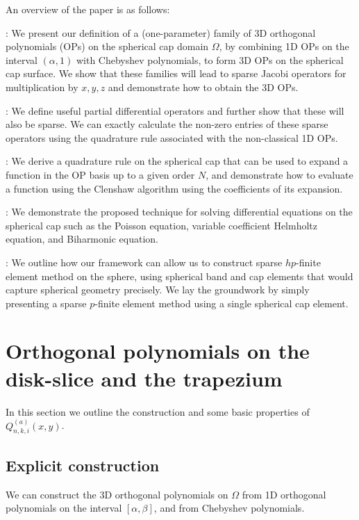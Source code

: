 \documentclass[11pt, oneside]{article}   	%
\newcommand{\scop}{Q}
\newcommand{\scopnki}{\scop_{n,k,i}}
\newcommand{\scopnkia}{\scopnki^{(a)}}
\begin{document}
An overview of the paper is as follows:  

\noindent {}: We present our definition of a (one-parameter) family of 3D orthogonal polynomials (OPs) on the spherical cap domain $\Omega$, by combining 1D OPs on the interval $(\alpha, 1)$ with Chebyshev polynomials, to form 3D OPs on the spherical cap surface. We show that these families will lead to sparse Jacobi operators for multiplication by $x, y, z$ and demonstrate how to obtain the 3D OPs.

\noindent{}: We define useful partial differential operators and further show that these will also be sparse. We can exactly calculate the non-zero entries of these sparse operators using the quadrature rule associated with the non-classical 1D OPs.

\noindent{}: We derive a quadrature rule on the spherical cap that can be used to expand a function in the OP basis up to a given order $N$, and demonstrate how to evaluate a function using the Clenshaw algorithm using the coefficients of its expansion.

\noindent{}: We demonstrate the proposed technique for solving differential equations on the spherical cap such as the Poisson equation, variable coefficient Helmholtz equation, and Biharmonic equation.  

\noindent{}: We outline how our framework can allow us to construct sparse $hp$-finite element method on the sphere, using spherical band and cap elements that would capture spherical geometry precisely. We lay the groundwork by simply presenting a sparse $p$-finite element method using a single spherical cap element. 


\section{Orthogonal polynomials on the disk-slice and the trapezium}\label{Section:OPs}

In this section we outline the construction and some basic properties of $\scopnkia(x,y)$.

\subsection{Explicit construction}

We can construct the 3D orthogonal polynomials on $\Omega$ from 1D orthogonal polynomials on the interval \([\alpha,\beta]\), and from Chebyshev polynomials. 
\end{document}
